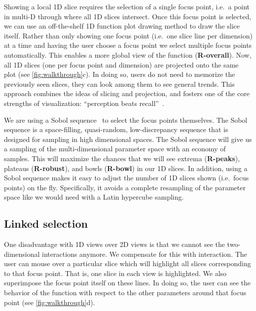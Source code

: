 Showing a local 1D slice requires the selection of a single focus point, i.e.\
a point in multi-D through where all 1D slices intersect. Once this focus
point is selected, we can use an off-the-shelf 1D function plot drawing
method to draw the slice itself.
Rather than only
showing one focus point (i.e.\ one slice line per dimension) at a time and
having the user choose a focus point we select multiple focus points
automatically. This enables a more global view of the function
(\textbf{R-overall}). Now, all 1D slices (one per focus point and dimension)
are projected onto the same plot (see \autoref{fig:walkthrough}c).  In doing
so, users do not need to memorize the previously seen slices, they can look
among them to see general trends. This approach combines the ideas of slicing
and projection, and fosters one of the core strengths of visualization:
``perception beats recall''~\cite{Munzner:2014}. 

We are using a Sobol sequence~\cite{Sobol:1967} to select the focus points
themselves.  The Sobol sequence is a space-filling, quasi-random,
low-discrepancy sequence that is designed for sampling in high dimensional
spaces.  The Sobol sequence will give us a sampling of the multi-dimensional
parameter space with an economy of samples. This will maximize the chances that
we will see extrema (\textbf{R-peaks}), plateaus (\textbf{R-robust}), and bowls
(\textbf{R-bowl}) in our 1D slices.  In addition, using a Sobol sequence makes
it easy to adjust the number of 1D slices shown (i.e.\ focus points) on the
fly.  Specifically, it avoids a complete resampling of the parameter space like
we would need with a Latin hypercube sampling. 



\subsection{Linked selection}

One disadvantage with 1D views over 2D views is that we cannot see the
two-dimensional interactions anymore. We compensate for this with
interaction. %
The user can mouse over a particular slice which will highlight
all slices corresponding to that focus point. That is, one slice in each view is highlighted.
We also superimpose the focus point itself on these lines. In doing so,
the user can see the behavior of the function with respect to the other
parameters around that focus point (see \autoref{fig:walkthrough}d).

